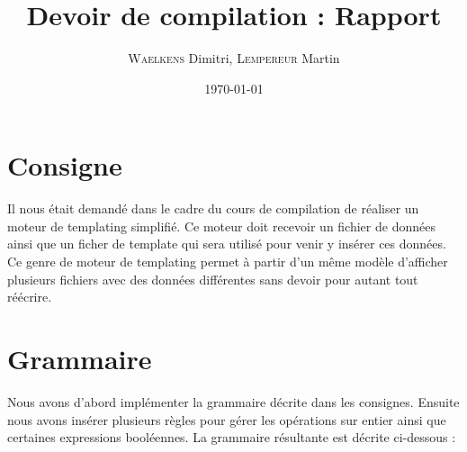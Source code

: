 \documentclass[10pt,a4paper]{article}
\author{\textsc{Waelkens} Dimitri, \textsc{Lempereur} Martin}
\begin{document}
\title{\LARGE{Devoir de compilation : Rapport}}
\date{\today}
\maketitle
\newpage
\tableofcontents
\newpage

\section{Consigne}
Il nous était demandé dans le cadre du cours de compilation de réaliser un moteur de templating simplifié.
Ce moteur doit recevoir un fichier de données ainsi que un ficher de template qui sera utilisé pour venir y insérer ces données.
Ce genre de moteur de templating permet à partir d'un même modèle d'afficher plusieurs fichiers avec des données différentes sans devoir pour autant tout réécrire.
\section{Grammaire}
Nous avons d'abord implémenter la grammaire décrite dans les consignes.
Ensuite nous avons insérer plusieurs règles pour gérer les opérations sur entier ainsi que certaines expressions booléennes.
La grammaire résultante est décrite ci-dessous :\\
\end{document}

